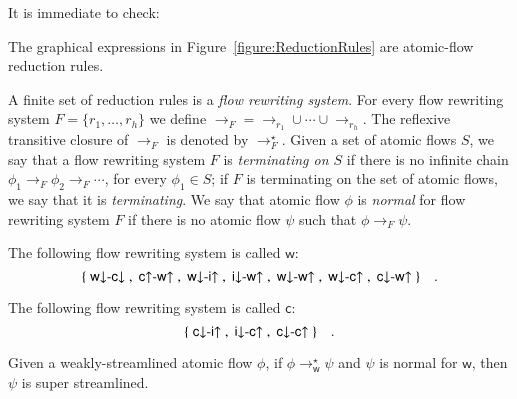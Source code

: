It is immediate to check:

\begin{proposition}\label{proposition:ValidReductionRules}
The graphical expressions in Figure~\vref{figure:ReductionRules} are atomic-flow reduction rules.
\end{proposition}

\begin{definition}\label{definition:FlowRewritingSystem}
A finite set of reduction rules is a \emph{flow rewriting system}. For every flow rewriting system $F=\{r_1,\dots,r_h\}$ we define ${\to_F}={\to_{r_1}\cup\cdots\cup{\to_{r_h}}}$. The reflexive transitive closure of $\to_F$ is denoted by $\to_F^\star$. Given a set of atomic flows $S$, we say that a flow rewriting system $F$ is \emph{terminating on $S$} if there is no infinite chain $\phi_1\to_F\phi_2\to_F\cdots$, for every $\phi_1\in S$; if $F$ is terminating on the set of atomic flows, we say that it is \emph{terminating}. We say that atomic flow $\phi$ is \emph{normal} for flow rewriting system $F$ if there is no atomic flow $\psi$ such that $\phi\to_F\psi$.
\end{definition}

\newcommand{\frw}{{\mathsf w}}
\begin{definition}\label{definition:FlowRewritingWeakening}
The following flow rewriting system is called $\frw$:
\[
\{\;{{\mathsf w}{\downarrow}{\hbox{-}}{\mathsf c}{\downarrow}}\;,\;{{\mathsf c}{\uparrow }{\hbox{-}}{\mathsf w}{\uparrow }}\;,\;{{\mathsf w}{\downarrow}{\hbox{-}}{\mathsf i}{\uparrow }}\;,\;{{\mathsf i}{\downarrow}{\hbox{-}}{\mathsf w}{\uparrow }}\;,\;{{\mathsf w}{\downarrow}{\hbox{-}}{\mathsf w}{\uparrow }}\;,\;{{\mathsf w}{\downarrow}{\hbox{-}}{\mathsf c}{\uparrow }}\;,\;{{\mathsf c}{\downarrow}{\hbox{-}}{\mathsf w}{\uparrow }}\;\}
\quad.
\]
\end{definition}

\newcommand{\frc}{{\mathsf c}}
\begin{definition}\label{definition:FlowRewritingContraction}
The following flow rewriting system is called $\frc$:
\[
\{\;{{\mathsf c}{\downarrow}{\hbox{-}}{\mathsf i}{\uparrow }}\;,\;{{\mathsf i}{\downarrow}{\hbox{-}}{\mathsf c}{\uparrow }}\;,\;{{\mathsf c}{\downarrow}{\hbox{-}}{\mathsf c}{\uparrow }}\;\}\quad.
\]
\end{definition}


\begin{theorem}\label{theorem:SuperStreamlining}
Given a weakly-streamlined atomic flow $\phi$, if $\phi\to_\frw^\star\psi$ and $\psi$ is normal for $\frw$, then $\psi$ is super streamlined.
\end{theorem}

